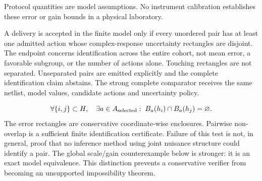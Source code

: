 \documentclass[10pt,letterpaper]{article}
\begin{document}
{\footnotesize Protocol quantities are model assumptions. No instrument calibration establishes these error or gain bounds in a physical laboratory.\par}\endgroup
A delivery is accepted in the finite model only if every unordered pair has at least one admitted action whose complex-response uncertainty rectangles are disjoint. The endpoint concerns identification across the entire cohort, not mean error, a favorable subgroup, or the number of actions alone. Touching rectangles are not separated. Unseparated pairs are emitted explicitly and the complete identification claim abstains. The strong complete comparator receives the same netlist, model values, candidate actions and uncertainty policy.\par
\[ \forall\{i,j\}\subset H,\quad \exists a\in A_{\rm selected}:\; B_a(h_i)\cap B_a(h_j)=\varnothing. \]
The error rectangles are conservative coordinate-wise enclosures. Pairwise non-overlap is a sufficient finite identification certificate. Failure of this test is not, in general, proof that no inference method using joint nuisance structure could identify a pair. The global scale/gain counterexample below is stronger: it is an exact model equivalence. This distinction prevents a conservative verifier from becoming an unsupported impossibility theorem.\par
\end{document}
